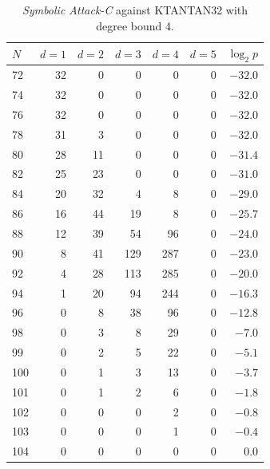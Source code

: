 \begin{table}
\begin{small}
 \begin{center}
\begin{tabular}{|l|r|r|r|r|r|r|}
\hline
$N$ & $d=1$ & $d=2$ & $d=3$ & $d=4$ & $d=5$& $\log_2 p$\\
\hline
 72 & 32 &  0 &   0 &   0 & 0 & ${-32.0}$\\                                                                                                                                         
 74 & 32 &  0 &   0 &   0 & 0 & ${-32.0}$\\                                                                                                                                         
 76 & 32 &  0 &   0 &   0 & 0 & ${-32.0}$\\                                                                                                                                         
 78 & 31 &  3 &   0 &   0 & 0 & ${-32.0}$\\
 80 & 28 & 11 &   0 &   0 & 0 & ${-31.4}$\\
 82 & 25 & 23 &   0 &   0 & 0 & ${-31.0}$\\
 84 & 20 & 32 &   4 &   8 & 0 & ${-29.0}$\\
 86 & 16 & 44 &  19 &   8 & 0 & ${-25.7}$\\
 88 & 12 & 39 &  54 &  96 & 0 & ${-24.0}$\\
 90 &  8 & 41 & 129 & 287 & 0 & ${-23.0}$\\
 92 &  4 & 28 & 113 & 285 & 0 & ${-20.0}$\\
 94 &  1 & 20 &  94 & 244 & 0 & ${-16.3}$\\
 96 &  0 &  8 &  38 &  96 & 0 & ${-12.8}$\\
 98 &  0 &  3 &   8 &  29 & 0 & ${-7.0 }$\\
 99 &  0 &  2 &   5 &  22 & 0 & ${-5.1 }$\\
100 &  0 &  1 &   3 &  13 & 0 & ${-3.7 }$\\
101 &  0 &  1 &   2 &   6 & 0 & ${-1.8 }$\\
102 &  0 &  0 &   0 &   2 & 0 & ${-0.8 }$\\
103 &  0 &  0 &   0 &   1 & 0 & ${-0.4 }$\\
104 &  0 &  0 &   0 &   0 & 0 &   ${0.0}$\\
\hline                                          
\end{tabular}                             
\end{center}
\end{small}
\caption{\emph{Symbolic Attack-C} against KTANTAN32 with degree bound 4.}
\label{tab:ktantan32-c-4}
\end{table}



